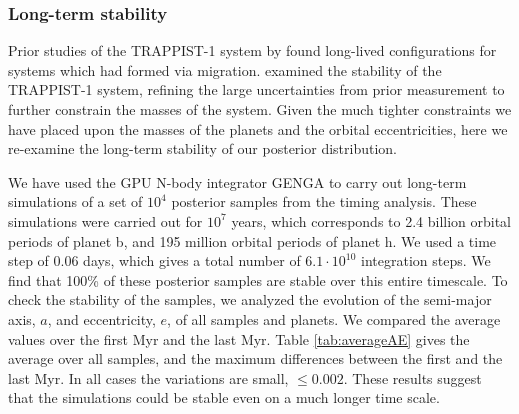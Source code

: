 \documentclass[fleqn,usenatbib]{mnras} %
\begin{document}
\subsubsection{Long-term stability}

Prior studies of the TRAPPIST-1 system by 
\citet{Tamayo2017} found long-lived configurations for
systems which had formed via migration.  \citet{Quarles2017} examined the stability
of the TRAPPIST-1 system,  refining the large uncertainties from prior
measurement \citep{Gillon2017} to further constrain the masses of
the system.  Given the much tighter constraints we have placed upon
the masses of the planets and the orbital eccentricities, here we
re-examine the long-term stability of our posterior distribution.

We have used the GPU N-body integrator GENGA \citep{Grimm2014} to carry out long-term simulations of a set of $10^4$ posterior samples from the timing analysis.  These simulations were carried out for $10^7$ years, which corresponds to 2.4 billion orbital periods of planet b, and 195 million orbital periods of planet h. We used a time step of 0.06 days, which gives a total number of $6.1 \cdot 10^{10}$ integration steps. We find that 100\% of these posterior samples are stable over this entire timescale. %
To check the stability of the samples, we analyzed the evolution of the semi-major axis, $a$, and eccentricity, $e$, of all samples and planets. We compared the average values over the first Myr and the last Myr. Table \ref{tab:averageAE} gives the average over all samples, and the maximum differences between the first and the last Myr.  In all cases the variations are small, ${\le}0.002$.  These results suggest that the simulations could be stable even on a much longer time scale. 
\end{document}
